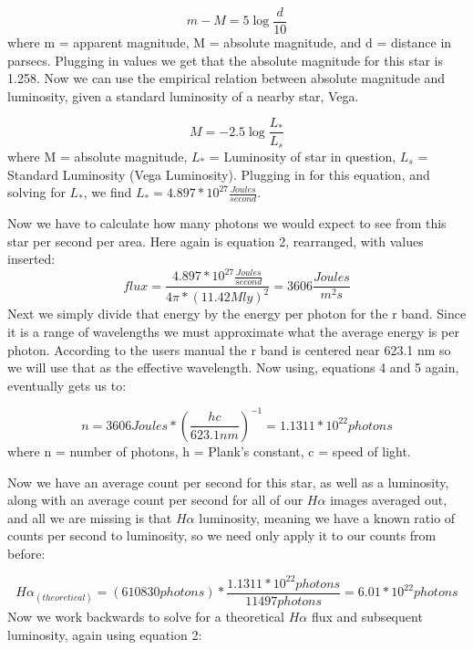 \documentclass[modern]{aastex63}
\begin{document}
\begin{equation}
m - M = 5 \log\frac{d}{10}
\end{equation} where m = apparent magnitude, M = absolute magnitude, and d = distance in parsecs. Plugging in values we get that the absolute magnitude for this star is 1.258. Now we can use the empirical relation between absolute magnitude and luminosity, given a standard luminosity of a nearby star, Vega.

\begin{equation}
M = -2.5 \log \frac{L_*}{L_s}
\end{equation} where M = absolute magnitude, $L_*$ = Luminosity of star in question, $L_s$ = Standard Luminosity (Vega Luminosity). Plugging in for this equation, and solving for $L_*$, we find $L_* = 4.897 *10^{27} \frac{Joules}{second}$. 

Now we have to calculate how many photons we would expect to see from this star per second per area. Here again is equation 2, rearranged, with values inserted:
\begin{equation}
flux = \frac{4.897*10^{27} \frac{Joules}{second}}{4\pi * (11.42 Mly)^{2}} = 3606 \frac{Joules}{m^2s}
\end{equation}
Next we simply divide that energy by the energy per photon for the r band. Since it is a range of wavelengths we must approximate what the average energy is per photon. According to the users manual the r band is centered near 623.1 nm so we will use that as the effective wavelength. Now using, equations 4 and 5 again, eventually gets us to:

\begin{equation}
n = 3606 Joules * (\frac{h c}{623.1 nm})^{-1} = 1.1311 * 10^{22} photons
\end{equation} where n = number of photons, h = Plank's constant, c = speed of light.

Now we have an average count per second for this star, as well as a luminosity, along with an average count per second for all of our $H\alpha$ images averaged out, and all we are missing is that $H\alpha$ luminosity, meaning we have a known ratio of counts per second to luminosity, so we need only apply it to our counts from before:

\begin{equation}
H\alpha_(theoretical)= (610830 photons) * \frac{1.1311 * 10^{22} photons}{11497 photons} = 6.01 * 10^{22} photons
\end{equation}
Now we work backwards to solve for a theoretical $H\alpha$ flux and subsequent luminosity, again using equation 2:
\end{document}
